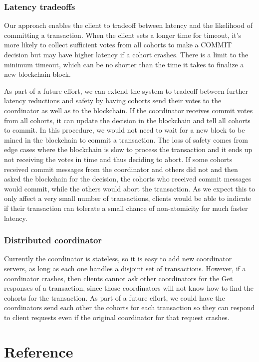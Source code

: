 \documentclass[11pt,conference]{IEEEtran}
\begin{document}
\subsubsection{Latency tradeoffs}
Our approach enables the client to tradeoff between latency and the likelihood of committing a transaction. When the client sets a longer time for timeout, it’s more likely to collect sufficient votes from all cohorts to make a COMMIT decision but may have higher latency if a cohort crashes. There is a limit to the minimum timeout, which can be no shorter than the time it takes to finalize a new blockchain block.

As part of a future effort, we can extend the system to tradeoff between further latency reductions and safety by having cohorts send their votes to the coordinator as well as to the blockchain. If the coordinator receives commit votes from all cohorts, it can update the decision in the blockchain and tell all cohorts to commit. In this procedure, we would not need to wait for a new block to be mined in the blockchain to commit a transaction. The loss of safety comes from edge cases where the blockchain is slow to process the transaction and it ends up not receiving the votes in time and thus deciding to abort. If some cohorts received commit messages from the coordinator and others did not and then asked the blockchain for the decision, the cohorts who received commit messages would commit, while the others would abort the transaction. As we expect this to only affect a very small number of transactions, clients would be able to indicate if their transaction can tolerate a small chance of non-atomicity for much faster latency.

\subsubsection{Distributed coordinator}
Currently the coordinator is stateless, so it is easy to add new coordinator servers, as long as each one handles a disjoint set of transactions. However, if a coordinator crashes, then clients cannot ask other coordinators for the Get responses of a transaction, since those coordinators will not know how to find the cohorts for the transaction. As part of a future effort, we could have the coordinators send each other the cohorts for each transaction so they can respond to client requests even if the original coordinator for that request crashes.

\section{Reference}
\end{document}
